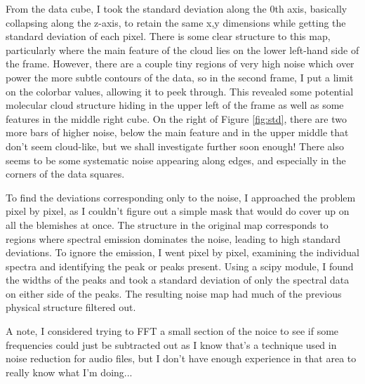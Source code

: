 \documentclass{article}
\begin{document}
From the data cube, I took the standard deviation along the 0th axis, basically collapsing along the z-axis, to retain the same x,y dimensions while getting the standard deviation of each pixel. There is some clear structure to this map, particularly where the main feature of the cloud lies on the lower left-hand side of the frame. However, there are a couple tiny regions of very high noise which over power the more subtle contours of the data, so in the second frame, I put a limit on the colorbar values, allowing it to peek through. This revealed some potential molecular cloud structure hiding in the upper left of the frame as well as some features in the middle right cube. On the right of Figure \ref{fig:std}, there are two more bars of higher noise, below the main feature and in the upper middle that don't seem cloud-like, but we shall investigate further soon enough! There also seems to be some systematic noise appearing along edges, and especially in the corners of the data squares.

To find the deviations corresponding only to the noise, I approached the problem pixel by pixel, as I couldn't figure out a simple mask that would do cover up on all the blemishes at once. The structure in the original map corresponds to regions where spectral emission dominates the noise, leading to high standard deviations. To ignore the emission, I went pixel by pixel, examining the individual spectra and identifying the peak or peaks present. Using a scipy module, I found the widths of the peaks and took a standard deviation of only the spectral data on either side of the peaks. The resulting noise map had much of the previous physical structure filtered out.

A note, I considered trying to FFT a small section of the noice to see if some frequencies could just be subtracted out as I know that's a technique used in noise reduction for audio files, but I don't have enough experience in that area to really know what I'm doing...
\end{document}
